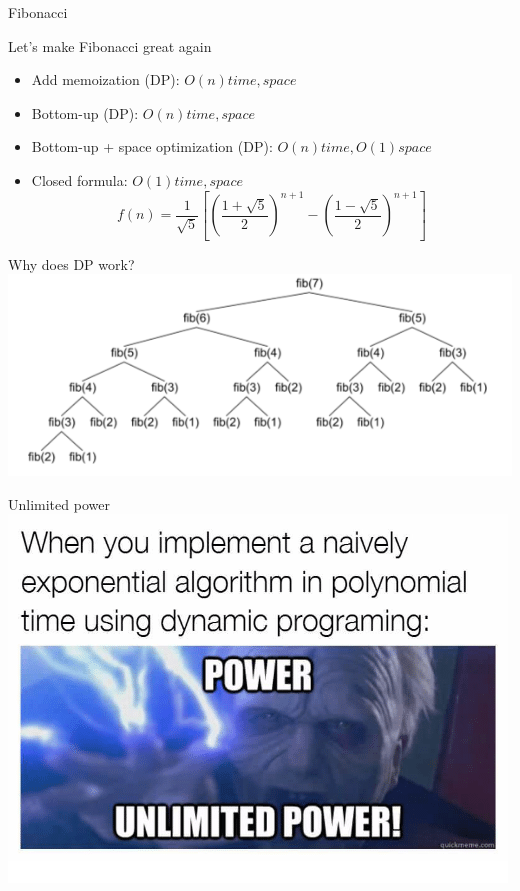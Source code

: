 \documentclass{beamer}
\begin{document}
    \begin{frame}{Fibonacci}
    \begin{block}{Let's make Fibonacci great again}
        \begin{itemize}
            \item Add memoization (DP): $O(n) time, space$
            \pause
            \item Bottom-up (DP): $O(n) time, space$
            \pause 
            \item Bottom-up + space optimization (DP): $O(n) time, O(1) space$
            \pause
            \item Closed formula: $O(1) time, space$
            $$f(n) = \frac{1}{\sqrt{5}}\left[\left(\frac{1+\sqrt{5}}{2}\right)^{n+1}-\left(\frac{1-\sqrt{5}}{2}\right)^{n+1}\right]$$
        \end{itemize}
    \end{block}
  \end{frame}
  
  \begin{frame}{Why does DP work?}
    \includegraphics[scale=0.8]{fib}
  \end{frame}
  
  \begin{frame}{Unlimited power}
    \includegraphics[scale=0.65]{meme1}
  \end{frame}
\end{document}
